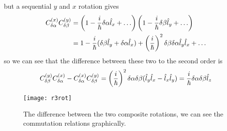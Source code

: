 but a sequential $y$ and $x$ rotation gives
\begin{equation}
\begin{aligned}
	C_{\delta\alpha}^{(x)}C_{\delta\beta}^{(y)}&=\lf(1-\frac{i}{\hbar}\delta\alpha\hat{l}_x+\dots \rt)\lf(1-\frac{i}{\hbar}\delta\beta\hat{l}_y+\dots \rt)\\
	&=1-\frac{i}{\hbar}(\delta\beta\hat{l}_y+\delta\alpha\hat{l}_x)+\lf(\frac{i}{\hbar} \rt)^2\delta\beta\delta\alpha\hat{l}_y\hat{l}_x+\dots
\end{aligned}
\end{equation}
so we can see that the difference between these two to the second order is 
\begin{equation}
	C_{\delta\beta}^{(y)}C_{\delta\alpha}^{(x)}-C_{\delta\alpha}^{(x)}C_{\delta\beta}^{(y)}=\left(\frac{i}{\hbar} \right)^2\delta\alpha\delta\beta(\hat{l}_y\hat{l}_x-\hat{l}_x\hat{l}_y)=\frac{i}{\hbar}\delta\alpha\delta\beta\hat{l}_z
\end{equation}
\begin{figure}[H]
	\texttt{[image: r3rot]}
	\centering
	\caption{The difference between the two composite rotations, we can see the commutation relations graphically.}
	\label{fig:r3rot}
\end{figure}
